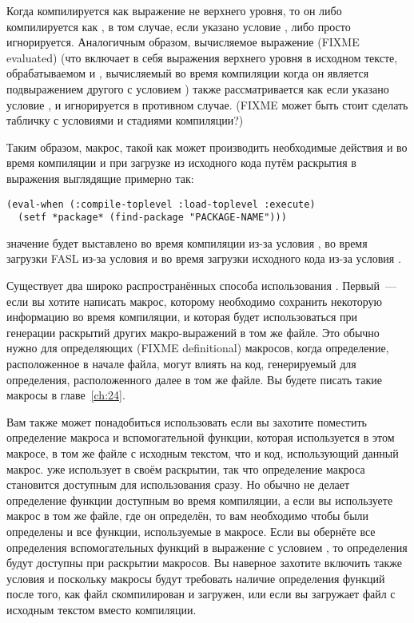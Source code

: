 Когда  компилируется как выражение не верхнего уровня, то он либо
компилируется как , в том случае, если указано условие , либо
просто игнорируется.  Аналогичным образом, вычисляемое выражение (FIXME evaluated)
 (что включает в себя выражения  верхнего уровня в
исходном тексте, обрабатываемом  и , вычисляемый во время
компиляции когда он является подвыражением другого  с условием
) также рассматривается как  если указано условие
, и игнорируется в противном случае. (FIXME может быть стоит сделать
табличку с условиями и стадиями компиляции?)

Таким образом, макрос, такой как  может производить необходимые действия
и во время компиляции и при загрузке из исходного кода путём раскрытия в выражения
 выглядящие примерно так:

\begin{lstlisting}
(eval-when (:compile-toplevel :load-toplevel :execute)
  (setf *package* (find-package "PACKAGE-NAME")))
\end{lstlisting}

значение  будет выставлено во время компиляции из-за условия
, во время загрузки FASL из-за условия  и во
время загрузки исходного кода из-за условия .

Существует два широко распространённых способа использования . Первый~---
если вы хотите написать макрос, которому необходимо сохранить некоторую информацию во
время компиляции, и которая будет использоваться при генерации раскрытий других
макро-выражений в том же файле.  Это обычно нужно для определяющих (FIXME definitional)
макросов, когда определение, расположенное в начале файла, могут влиять на код,
генерируемый для определения, расположенного далее в том же файле.  Вы будете писать такие
макросы в главе~\ref{ch:24}.

Вам также может понадобиться использовать  если вы захотите поместить
определение макроса и вспомогательной функции, которая используется в этом макросе, в том
же файле с исходным текстом, что и код, использующий данный макрос.  уже
использует  в своём раскрытии, так что определение макроса становится
доступным для использования сразу.  Но обычно  не делает определение функции
доступным во время компиляции, а если вы используете макрос в том же файле, где он
определён, то вам необходимо чтобы были определены и все функции, используемые в
макросе. Если вы обернёте все определения вспомогательных функций в выражение
 с условием , то определения будут доступны при
раскрытии макросов. Вы наверное захотите включить также условия  и
 поскольку макросы будут требовать наличие определения функций после того,
как файл скомпилирован и загружен, или если вы загружает файл с исходным текстом вместо
компиляции.

